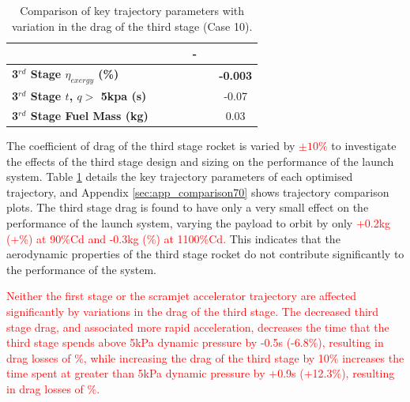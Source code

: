 \begin{table}[ht]
\begin{tabular}{l c c c c c c}
			& \SecondDistCdThreeStandardNoReturn
			& \SecondDistCdThreeOneOneHundredFiveNoReturn
			& \SecondDistCdThreeOneHundredTenNoReturn
			& -
			\\
			\hline 
			\textbf{3$^{rd}$ Stage $\eta_{exergy}$ (\%)}
			& \textbf{\thirddExergyEffCdThreeNinetyNoReturn}
			& \textbf{\thirddExergyEffCdThreeNinetyFiveNoReturn}
			& \textbf{\thirddExergyEffCdThreeStandardNoReturn}
			& \textbf{\thirddExergyEffCdThreeOneOneHundredFiveNoReturn}
			& \textbf{\thirddExergyEffCdThreeOneHundredTenNoReturn}
			& \textbf{-0.003}
			\\
			\textbf{3$^{rd}$ Stage $t$, $q >$ 5kpa (s)}
			& \thirdqOverFiveCdThreeNinetyNoReturn
			& \thirdqOverFiveCdThreeNinetyFiveNoReturn
			& \thirdqOverFiveCdThreeStandardNoReturn
			& \thirdqOverFiveCdThreeOneOneHundredFiveNoReturn
			& \thirdqOverFiveCdThreeOneHundredTenNoReturn
			&-0.07
			\\
			\textbf{3$^{rd}$ Stage Fuel Mass (kg)}
			& \thirdmFuelCdThreeNinetyNoReturn
			& \thirdmFuelCdThreeNinetyFiveNoReturn
			& \thirdmFuelCdThreeStandardNoReturn
			& \thirdmFuelCdThreeOneOneHundredFiveNoReturn
			& \thirdmFuelCdThreeOneHundredTenNoReturn
			&0.03
			\\
			\hline 
		\end{tabular} 
	\caption{Comparison of key trajectory parameters with variation in the drag of the third stage (Case 10).}
	\label{tab:comparison70}
	
\end{table}

The coefficient of drag of the third stage rocket is varied by \textcolor{red}{$\pm10\%$} to investigate the effects of the third stage design and sizing on the performance of the launch system. Table \ref{tab:comparison70} details the key trajectory parameters of each optimised trajectory, and Appendix \ref{sec:app_comparison70} shows trajectory comparison plots. The third stage drag is found to have only a very small effect on the performance of the launch system, varying the payload to orbit by only \textcolor{red}{+0.2kg (+\PayloadVarCdThreeNinetyNoReturn\%) at 90\%Cd and -0.3kg (\PayloadVarCdThreeOneHundredTenNoReturn\%) at 1100\%Cd.} This indicates that the aerodynamic properties of the third stage rocket do not contribute significantly to the performance of the system. 

\textcolor{red}{ 
Neither the first stage or the scramjet accelerator trajectory are affected significantly by variations in the drag of the third stage. 
The decreased third stage drag, and associated more rapid acceleration, decreases the time that the third stage spends above 5kPa dynamic pressure by -0.5s (-6.8\%), resulting in drag losses of \WDthreeCdThreeNinetyNoReturn\%, while increasing the drag of the third stage by 10\% increases the time spent at greater than 5kPa dynamic pressure by +0.9s (+12.3\%), resulting in drag losses of \WDthreeCdThreeOneHundredTenNoReturn\%. }


